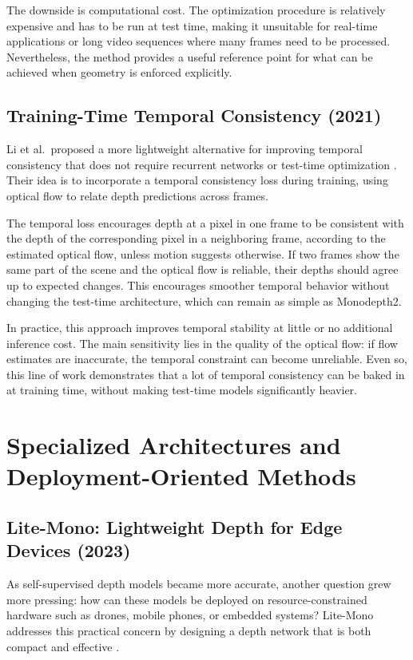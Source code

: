 \documentclass[10pt,twocolumn,letterpaper]{article}
\begin{document}
The downside is computational cost. The optimization procedure is relatively expensive and has to be run at test time, making it unsuitable for real-time applications or long video sequences where many frames need to be processed. Nevertheless, the method provides a useful reference point for what can be achieved when geometry is enforced explicitly.

\subsection{Training-Time Temporal Consistency (2021)}

Li et al.\ proposed a more lightweight alternative for improving temporal consistency that does not require recurrent networks or test-time optimization \cite{li2021enforcing}. Their idea is to incorporate a temporal consistency loss during training, using optical flow to relate depth predictions across frames.

The temporal loss encourages depth at a pixel in one frame to be consistent with the depth of the corresponding pixel in a neighboring frame, according to the estimated optical flow, unless motion suggests otherwise. If two frames show the same part of the scene and the optical flow is reliable, their depths should agree up to expected changes. This encourages smoother temporal behavior without changing the test-time architecture, which can remain as simple as Monodepth2.

In practice, this approach improves temporal stability at little or no additional inference cost. The main sensitivity lies in the quality of the optical flow: if flow estimates are inaccurate, the temporal constraint can become unreliable. Even so, this line of work demonstrates that a lot of temporal consistency can be baked in at training time, without making test-time models significantly heavier.

\section{Specialized Architectures and Deployment-Oriented Methods}
\label{sec:specialized}

\subsection{Lite-Mono: Lightweight Depth for Edge Devices (2023)}

As self-supervised depth models became more accurate, another question grew more pressing: how can these models be deployed on resource-constrained hardware such as drones, mobile phones, or embedded systems? Lite-Mono addresses this practical concern by designing a depth network that is both compact and effective \cite{zhang2023lite}.
\end{document}
